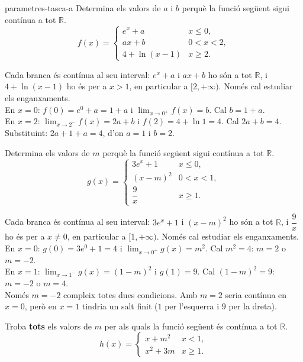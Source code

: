 \begin{apartats}

\begin{tria}{parametres-tasca-a}
Determina els valors de $a$ i $b$ perquè la funció següent sigui contínua a tot $\mathbb{R}$.
\[
f(x)=\begin{cases}
  e^{x}+a & \si{x\le 0},\\[3pt]
  ax+b & \si{0<x<2},\\[3pt]
  4+\ln(x-1) & \si{x\ge 2}.
\end{cases}
\]

\begin{solucio}
Cada branca és contínua al seu interval: $e^x+a$ i $ax+b$ ho són a tot $\mathbb{R}$, i
$4+\ln(x-1)$ ho és per a $x>1$, en particular a $[2,+\infty)$. Només cal estudiar els
enganxaments.\\
En $x=0$: $f(0)=e^0+a=1+a$ i $\lim_{x\to0^+}f(x)=b$. Cal $b=1+a$.\\
En $x=2$: $\lim_{x\to2^-}f(x)=2a+b$ i $f(2)=4+\ln1=4$. Cal $2a+b=4$.\\
Substituint: $2a+1+a=4$, d'on $\boxed{a=1}$ i $\boxed{b=2}$.
\end{solucio}

Determina els valors de $m$ perquè la funció següent sigui contínua a tot $\mathbb{R}$.
\[
g(x)=\begin{cases}
  3e^{x}+1 & \si{x\le 0},\\[3pt]
  (x-m)^2 & \si{0<x<1},\\[6pt]
  \dfrac{9}{x} & \si{x\ge 1}.
\end{cases}
\]

\begin{solucio}
Cada branca és contínua al seu interval: $3e^x+1$ i $(x-m)^2$ ho són a tot $\mathbb{R}$, i
$\dfrac9x$ ho és per a $x\ne0$, en particular a $[1,+\infty)$. Només cal estudiar els
enganxaments.\\
En $x=0$: $g(0)=3e^0+1=4$ i $\lim_{x\to0^+}g(x)=m^2$. Cal $m^2=4$: $m=2$ o $m=-2$.\\
En $x=1$: $\lim_{x\to1^-}g(x)=(1-m)^2$ i $g(1)=9$. Cal $(1-m)^2=9$: $m=-2$ o $m=4$.\\
Només $\boxed{m=-2}$ compleix totes dues condicions. Amb $m=2$ seria contínua en $x=0$, però
en $x=1$ tindria un salt finit ($1$ per l'esquerra i $9$ per la dreta).
\end{solucio}
\end{tria}

\begin{nomesllarg}
Troba \textbf{tots} els valors de $m$ per als quals la funció següent és contínua a tot
$\mathbb{R}$.
\[
h(x)=\begin{cases}
  x+m^2 & \si{x<1},\\[3pt]
  x^2+3m & \si{x\ge 1}.
\end{cases}
\]


\end{nomesllarg}
\end{apartats}
